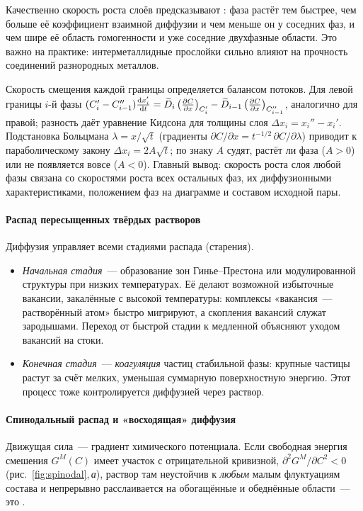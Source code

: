 Качественно скорость роста слоёв предсказывают :
фаза растёт тем быстрее, чем больше её коэффициент взаимной диффузии и
чем меньше он у соседних фаз, и чем шире её область гомогенности и уже
соседние двухфазные области. Это важно на практике: интерметаллидные
прослойки сильно влияют на прочность соединений разнородных металлов.

\begin{podrobnee}
Скорость смещения каждой границы определяется балансом потоков. Для
левой границы $i$-й фазы
$(C_i'-C_{i-1}'')\frac{\mathop{}\!\mathrm{d} x_i'}{\mathop{}\!\mathrm{d} t}=\widetilde D_i\left(\frac{\partial C}{\partial x}\right)_{C_i'}-\widetilde D_{i-1}\left(\frac{\partial C}{\partial x}\right)_{C_{i-1}''}$,
аналогично для правой; разность даёт уравнение Кидсона для толщины слоя
$\Delta x_i=x_i''-x_i'$. Подстановка Больцмана $\lambda=x/\sqrt t$ (градиенты
$\partial C/\partial x=t^{-1/2}\,\partial C/\partial\lambda$) приводит к
параболическому закону $\Delta x_i=2A\sqrt t$; по знаку $A$ судят, растёт
ли фаза ($A>0$) или не появляется вовсе ($A<0$). Главный вывод: скорость
роста слоя любой фазы связана со скоростями роста всех остальных фаз,
их диффузионными характеристиками, положением фаз на диаграмме и
составом исходной пары.
\end{podrobnee}

\paragraph{Распад пересыщенных твёрдых растворов}
Диффузия управляет всеми стадиями распада (старения).
\begin{itemize}
\item \emph{Начальная стадия}~— образование зон Гинье--Престона или
модулированной структуры при низких температурах. Её делают возможной
избыточные вакансии, закалённые с высокой температуры: комплексы
«вакансия~— растворённый атом» быстро мигрируют, а скопления вакансий
служат зародышами. Переход от быстрой стадии к медленной объясняют
уходом вакансий на стоки.
\item \emph{Конечная стадия}~— \emph{коагуляция} частиц стабильной фазы:
крупные частицы растут за счёт мелких, уменьшая суммарную поверхностную
энергию. Этот процесс тоже контролируется диффузией через раствор.
\end{itemize}

\paragraph{Спинодальный распад и «восходящая» диффузия}
Движущая сила~— градиент химического потенциала. Если свободная энергия
смешения $G^M(C)$ имеет участок с отрицательной кривизной,
$\partial^2G^M/\partial C^2<0$ (рис.~\ref{fig:spinodal},\,\textit{а}),
раствор там неустойчив к \emph{любым} малым флуктуациям состава и
непрерывно расслаивается на обогащённые и обеднённые области~— это
.

